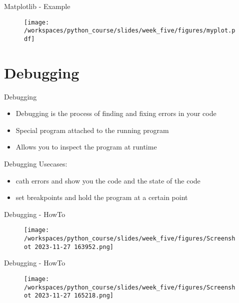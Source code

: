 \documentclass{beamer}
\begin{document}
\begin{frame}{Matplotlib - Example}
    \begin{figure}
        \centering
        \texttt{[image: /workspaces/python\_course/slides/week\_five/figures/myplot.pdf]}
    \end{figure}
\end{frame}

\section{Debugging}

\begin{frame}{Debugging}
    \begin{itemize}
        \item  <1-> Debugging is the process of finding and fixing errors in your code
        \item  <2-> Special program attached to the running program
        \item <3-> Allows you to inspect the program at runtime
    \end{itemize}
\end{frame}

\begin{frame}{Debugging}
    Usecases:
    \begin{itemize}
        \item cath errors and show you the code and the state of the code
        \item set breakpoints and hold the program at a certain point
    \end{itemize}
\end{frame}

\begin{frame}{Debugging - HowTo}
    \begin{figure}
        \centering
        \texttt{[image: /workspaces/python\_course/slides/week\_five/figures/Screenshot 2023-11-27 163952.png]}
    \end{figure}
\end{frame}

\begin{frame}{Debugging - HowTo}
    \begin{figure}
        \centering
        \texttt{[image: /workspaces/python\_course/slides/week\_five/figures/Screenshot 2023-11-27 165218.png]}
    \end{figure}
\end{frame}
\end{document}
